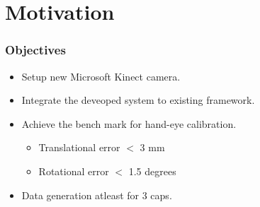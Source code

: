 \section{Motivation}
\begin{frame}
	\frametitle{Objectives}
	\begin{itemize}
		\item Setup new Microsoft Kinect camera.
		\item Integrate the deveoped system to existing framework.
		\item Achieve the bench mark for hand-eye calibration.
		\begin{itemize}
			\item Translational error $<$ 3 mm
			\item Rotational error $<$ 1.5 degrees
		\end{itemize} 
		\item Data generation atleast for 3 caps.
	\end{itemize}
\end{frame}




